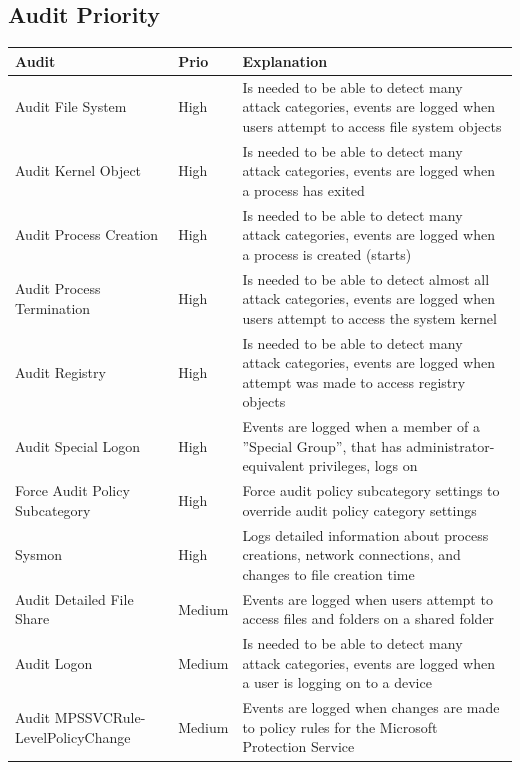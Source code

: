 \subsection{Audit Priority}
\begin{table}[H]
    \centering
    \begin{tabular}{| p{5cm} | p{1.5cm} | p{9.5cm} |} \hline 
        \textbf{Audit} & \textbf{Prio} & \textbf{Explanation} \\ \hline
        Audit File System & High & Is needed to be able to detect many attack categories, events are logged when users attempt to access file system objects \\ \hline
        Audit Kernel Object & High & Is needed to be able to detect many attack categories, events are logged when a process has exited \\ \hline
        Audit Process Creation & High & Is needed to be able to detect many attack categories, events are logged when a process is created (starts)\\ \hline
        Audit Process Termination & High & Is needed to be able to detect almost all attack categories, events are logged when users attempt to access the system kernel \\ \hline
        Audit Registry & High & Is needed to be able to detect many attack categories, events are logged when attempt was made to access registry objects \\ \hline
        Audit Special Logon & High & Events are logged when a member of a ''Special Group'', that has administrator-equivalent privileges, logs on \\ \hline
        Force Audit Policy Subcategory & High & Force audit policy subcategory settings to override audit policy category settings\\ \hline
        Sysmon & High & Logs detailed information about process creations, network connections, and changes to file creation time \\ \hline
        Audit Detailed File Share & Medium & Events are logged when users attempt to access files and folders on a shared folder \\ \hline
        Audit Logon & Medium & Is needed to be able to detect many attack categories, events are logged when a user is logging on to a device \\ \hline
        Audit MPSSVCRule-LevelPolicyChange & Medium & Events are logged when changes are made to policy rules for the Microsoft Protection Service\\ \hline

\end{tabular}
\end{table}
